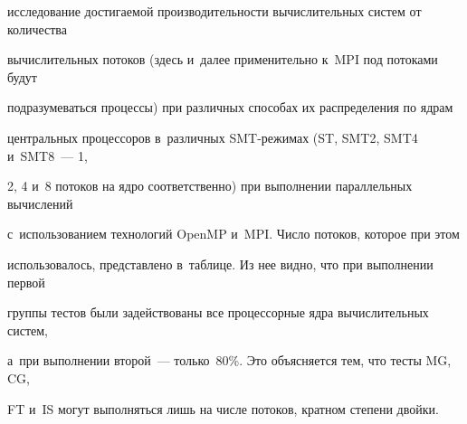 исследование достигаемой производительности вычислительных систем от количества 


вычислительных потоков (здесь и~далее применительно к~MPI под потоками будут 


подразумеваться процессы) при различных способах их распределения по ядрам 


центральных процессоров в~различных SMT-режимах (ST, SMT2, SMT4 и~SMT8~--- 1, 


2, 4 и~8 потоков на ядро соответственно) при выполнении параллельных вычислений 


с~использованием технологий OpenMP и~MPI. Число потоков, которое при этом 


использовалось, представлено в~таблице. Из нее видно, что при выполнении первой 


группы тес\-тов были задействованы все процессорные ядра вычислительных систем, 


а~при выполнении второй~--- только~80\%. Это объясняется тем, что тесты MG, CG, 


FT и~IS могут выполняться лишь на чис\-ле потоков, кратном степени двойки.








